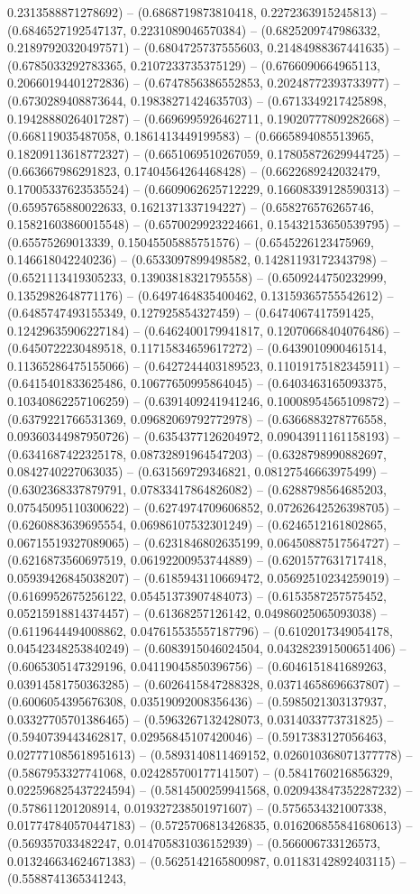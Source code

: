 0.2313588871278692) -- (0.6868719873810418, 0.2272363915245813) -- (0.6846527192547137, 0.2231089046570384) -- (0.6825209747986332, 0.21897920320497571) -- (0.6804725737555603, 0.21484988367441635) -- (0.6785033292783365, 0.2107233735375129) -- (0.6766090664965113, 0.20660194401272836) -- (0.6747856386552853, 0.20248772393733977) -- (0.6730289408873644, 0.19838271424635703) -- (0.6713349217425898, 0.19428880264017287) -- (0.6696995926462711, 0.19020777809282668) -- (0.668119035487058, 0.1861413449199583) -- (0.6665894085513965, 0.18209113618772327) -- (0.6651069510267059, 0.17805872629944725) -- (0.663667986291823, 0.17404564264468428) -- (0.6622689242032479, 0.17005337623535524) -- (0.6609062625712229, 0.16608339128590313) -- (0.6595765880022633, 0.1621371337194227) -- (0.658276576265746, 0.15821603860015548) -- (0.6570029923224661, 0.15432153650539795) -- (0.65575269013339, 0.15045505885751576) -- (0.6545226123475969, 0.146618042240236) -- (0.6533097899498582, 0.14281193172343798) -- (0.6521113419305233, 0.13903818321795558) -- (0.6509244750232999, 0.1352982648771176) -- (0.6497464835400462, 0.13159365755542612) -- (0.6485747493155349, 0.127925854327459) -- (0.6474067417591425, 0.12429635906227184) -- (0.6462400179941817, 0.12070668404076486) -- (0.6450722230489518, 0.11715834659617272) -- (0.6439010900461514, 0.11365286475155066) -- (0.6427244403189523, 0.11019175182345911) -- (0.6415401833625486, 0.10677650995864045) -- (0.6403463165093375, 0.10340862257106259) -- (0.6391409241941246, 0.10008954565109872) -- (0.6379221766531369, 0.09682069792772978) -- (0.6366883278776558, 0.09360344987950726) -- (0.6354377126204972, 0.09043911161158193) -- (0.6341687422325178, 0.08732891964547203) -- (0.6328798990882697, 0.0842740227063035) -- (0.631569729346821, 0.08127546663975499) -- (0.6302368337879791, 0.07833417864826082) -- (0.6288798564685203, 0.07545095110300622) -- (0.6274974709606852, 0.07262642526398705) -- (0.6260883639695554, 0.06986107532301249) -- (0.6246512161802865, 0.06715519327089065) -- (0.6231846802635199, 0.06450887517564727) -- (0.6216873560697519, 0.06192200953744889) -- (0.6201577631717418, 0.05939426845038207) -- (0.6185943110669472, 0.05692510234259019) -- (0.6169952675256122, 0.05451373907484073) -- (0.6153587257575452, 0.05215918814374457) -- (0.61368257126142, 0.04986025065093038) -- (0.6119644494008862, 0.047615535557187796) -- (0.6102017349054178, 0.04542348253840249) -- (0.6083915046024504, 0.043282391500651406) -- (0.6065305147329196, 0.04119045850396756) -- (0.6046151841689263, 0.03914581750363285) -- (0.6026415847288328, 0.03714658696637807) -- (0.6006054395676308, 0.03519092008356436) -- (0.5985021303137937, 0.03327705701386465) -- (0.5963267132428073, 0.0314033773731825) -- (0.5940739443462817, 0.02956845107420046) -- (0.5917383127056463, 0.027771085618951613) -- (0.5893140811469152, 0.026010368071377778) -- (0.5867953327741068, 0.024285700177141507) -- (0.5841760216856329, 0.022596825437224594) -- (0.5814500259941568, 0.020943847352287232) -- (0.578611201208914, 0.019327238501971607) -- (0.5756534321007338, 0.017747840570447183) -- (0.5725706813426835, 0.016206855841680613) -- (0.569357033482247, 0.014705831036152939) -- (0.566006733126573, 0.013246634624671383) -- (0.5625142165800987, 0.01183142892403115) -- (0.5588741365341243, 